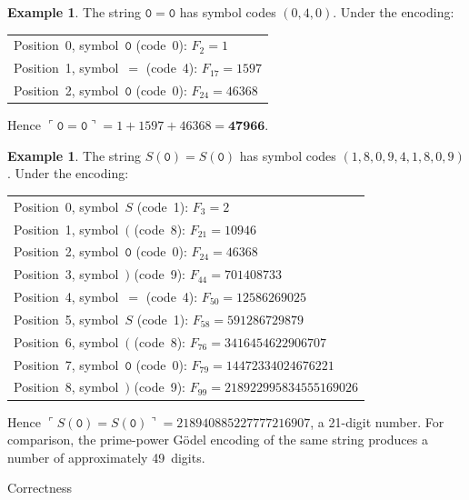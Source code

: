 \documentclass[11pt]{amsart}
\makeatletter
\renewcommand{\section}{\@startsection{section}{1}%
  \z@{.7\linespacing\@plus\linespacing}{.5\linespacing}%
  {\normalfont\bfseries}}
\theoremstyle{plain}
\theoremstyle{definition}
\newtheorem{example}[theorem]{Example}
\theoremstyle{remark}
\newcommand{\gc}[1]{\ulcorner #1 \urcorner}
\makeatother
\begin{document}
\begin{example}\label{ex:0eq0}
The string $\mathtt{0=0}$ has symbol codes $(0,4,0)$. Under the encoding:

\smallskip
\noindent
\begin{tabular}{@{}l@{}}
Position~0, symbol~$\mathtt{0}$ (code~0): $F_2 = 1$ \\
Position~1, symbol~$=$ (code~4): $F_{17} = 1597$ \\
Position~2, symbol~$\mathtt{0}$ (code~0): $F_{24} = 46368$
\end{tabular}
\smallskip

\noindent Hence $\gc{\mathtt{0=0}} = 1 + 1597 + 46368 = \mathbf{47966}$.
\end{example}

\begin{example}\label{ex:s0eqs0}
The string $S(\mathtt{0})=S(\mathtt{0})$ has symbol codes $(1,8,0,9,4,1,8,0,9)$. Under the encoding:

\smallskip
\noindent
\begin{tabular}{@{}l@{}}
Position~0, symbol~$S$ (code~1): $F_3 = 2$ \\
Position~1, symbol~$($ (code~8): $F_{21} = 10946$ \\
Position~2, symbol~$\mathtt{0}$ (code~0): $F_{24} = 46368$ \\
Position~3, symbol~$)$ (code~9): $F_{44} = 701408733$ \\
Position~4, symbol~$=$ (code~4): $F_{50} = 12586269025$ \\
Position~5, symbol~$S$ (code~1): $F_{58} = 591286729879$ \\
Position~6, symbol~$($ (code~8): $F_{76} = 3416454622906707$ \\
Position~7, symbol~$\mathtt{0}$ (code~0): $F_{79} = 14472334024676221$ \\
Position~8, symbol~$)$ (code~9): $F_{99} = 218922995834555169026$
\end{tabular}
\smallskip

\noindent Hence $\gc{S(\mathtt{0})=S(\mathtt{0})} = 218940885227777216907$, a 21-digit number. For comparison, the prime-power G\"odel encoding of the same string produces a number of approximately 49~digits.
\end{example}


\section{Correctness}
\end{document}
